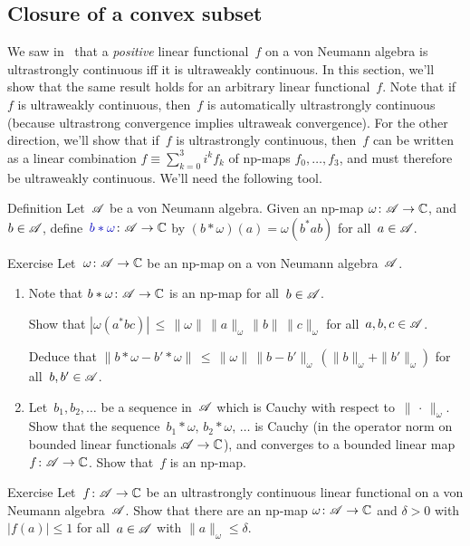\documentclass[a]{subfiles}
\begin{document}
\subsection{Closure of a convex subset}
\begin{parsec}%
\begin{point}%
We saw in~
that a \emph{positive} linear functional~$f$
on a von Neumann algebra 
is ultrastrongly continuous iff it is ultraweakly continuous.
In this section, we'll show that the same result holds
for an arbitrary linear functional~$f$.
Note that if~$f$ is ultraweakly continuous,
then~$f$ is automatically ultrastrongly continuous
(because ultrastrong convergence implies ultraweak convergence).
For the other direction,
we'll show that if~$f$ is ultrastrongly continuous,
then~$f$ can be written as a linear combination
$f\equiv \sum_{k=0}^3 i^k f_k$
of np-maps $f_0,\dotsc,f_3$,
and must therefore be ultraweakly continuous.
We'll need the following tool.
\end{point}
\begin{point}[bstaromega]{Definition}%
Let~$\mathscr{A}$ be a von Neumann algebra.
Given an np-map $\omega\colon \mathscr{A}\to\mathbb{C}$,
and~$b\in \mathscr{A}$,
define~$\Define{b*\omega}\colon \scrA\to \C$ by
$(b*\omega)(a)=\omega(b^*ab)$ for all~$a\in \mathscr{A}$.
\end{point}
\begin{point}{Exercise}%
Let~$\omega\colon \mathscr{A}\to \mathbb{C}$ be an np-map on a von Neumann algebra~$\mathscr{A}$.
\begin{enumerate}
\item
Note that $b*\omega\colon \mathscr{A}\to\mathbb{C}$
is an np-map for all~$b\in \mathscr{A}$.

Show that $\left|\omega(a^*bc)\right| 
\,\leq\, \|\omega\|\,\|a\|_\omega\, \|b\|\, \|c\|_\omega$
for all~$a,b,c\in\mathscr{A}$.

Deduce that $\| b*\omega - b'*\omega\|
\,\leq\, \|\omega\| \,\|b-b'\|_\omega\, (\|b\|_\omega + \|b'\|_\omega)$
for all~$b,b'\in\mathscr{A}$.

\item
Let~$b_1,b_2,\dotsc$ be a sequence in~$\mathscr{A}$
which is Cauchy with respect to~$\|\,\cdot\,\|_\omega$.
Show that the sequence~$b_1*\omega,\,b_2*\omega,\,\dotsc$ 
is Cauchy (in the operator norm
on bounded linear functionals $\mathscr{A}\to\mathbb{C}$),
and converges to a bounded linear map~$f\colon \mathscr{A}\to\mathbb{C}$.
Show that~$f$ is an np-map.
\end{enumerate}
\end{point}
\begin{point}{Exercise}%
Let~$f\colon \mathscr{A}\to \mathbb{C}$ be an ultrastrongly continuous linear
functional on a von Neumann algebra~$\mathscr{A}$.
Show that there are an np-map
$\omega\colon \mathscr{A}\to \mathbb{C}$
and $\delta>0$
with $\left|f(a)\right|\leq 1$
for all~$a\in\mathscr{A}$ with $\|a\|_\omega \leq \delta$.


\end{point}
\end{parsec}
\end{document}
